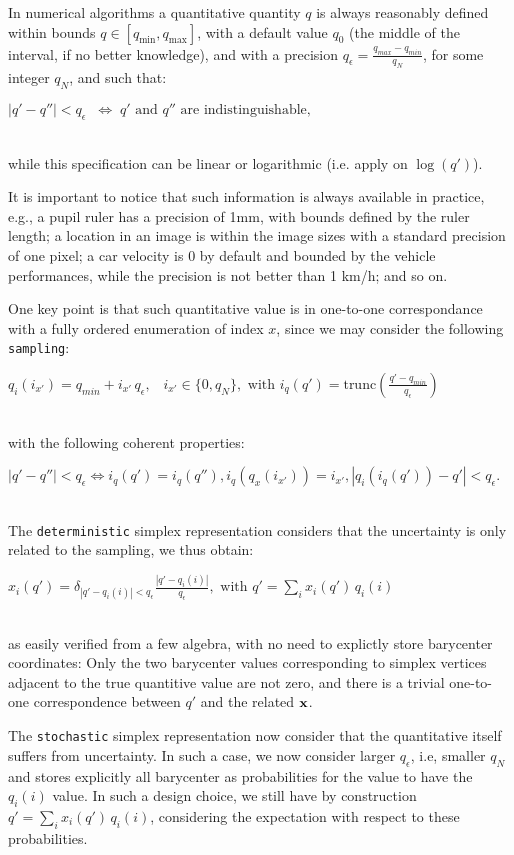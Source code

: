 \documentclass[a4,12pt]{article}
\newcommand{\eqline}[1]{\\\centerline{$#1$}\\}
\begin{document}
In numerical algorithms a quantitative quantity $q$ is always reasonably defined within bounds $q \in [q_{\min}, q_{\max}]$, with a default value $q_0$ (the middle of the interval, if no better knowledge), and with a precision $q_\epsilon = \frac{q_{max} - q_{min}}{q_N}$, for some integer $q_N$, and such that:
\eqline{|q' - q''| < q_\epsilon \;\;\Leftrightarrow\; \mbox{$q'$ and $q''$ are indistinguishable},}
while this specification can be linear or logarithmic (i.e. apply on $\log(q')$).

It is important to notice that such information is always available in practice, e.g., a pupil ruler has a precision of 1mm, with bounds defined by the ruler length; a location in an image is within the image sizes with a standard precision of one pixel; a car velocity is 0 by default and bounded by the vehicle performances, while the precision is not better than 1 km/h; and so on.

One key point is that such quantitative value is in one-to-one correspondance with a fully ordered enumeration of index $x$, since we may consider the following {\tt sampling}:
\eqline{q_i(i_{x'}) = q_{min} + i_{x'} \, q_\epsilon, \;\;\; i_{x'} \in \{0, q_N\}, \mbox{ with } i_q(q') = \mbox{trunc}\left(\frac{q' - q_{min}}{q_\epsilon}\right)}
with the following coherent properties:
\eqline{|q' - q''| < q_\epsilon \Leftrightarrow i_q(q') = i_q(q''), i_q(q_x(i_{x'})) = i_{x'}, |q_i(i_q(q')) - q'| <  q_\epsilon.}

The {\tt deterministic} simplex representation considers that the uncertainty is only related to the sampling, we thus obtain:
\eqline{x_i(q') = \delta_{|q' - q_i(i)| < q_\epsilon} \frac{|q' - q_i(i)|}{q_\epsilon},  \mbox{ with } q' = \sum_i x_i(q') \, q_i(i)}
as easily verified from a few algebra, with no need to explictly store barycenter coordinates: Only the two barycenter values corresponding to simplex vertices adjacent to the true quantitive value are not zero, and there is a trivial one-to-one correspondence between $q'$ and the related ${\bf x}$.

The {\tt stochastic} simplex representation now consider that the quantitative itself suffers from uncertainty. In such a case, we now consider larger $q_\epsilon$, i.e, smaller $q_N$ and stores explicitly all barycenter as probabilities for the value to have the $q_i(i)$ value. In such a design choice, we still have by construction $q' = \sum_i x_i(q') \, q_i(i)$, considering the expectation with respect to these probabilities.
\end{document}

